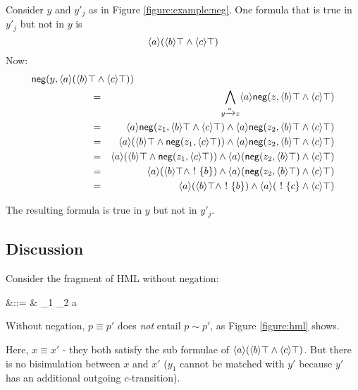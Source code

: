 Consider $y$ and $y'_j$ as in Figure \ref{figure:example:neg}.
One formula that is true in $y'_j$ but not in $y$ is
\[
\langle a \rangle (\langle b \rangle \top \land \langle c \rangle \top)
\]
Now:
\begin{eqnarray*}
\lefteqn{\mathsf{neg}(y, \langle a \rangle (\langle b \rangle \top \AND \langle c \rangle \top))}\qquad \qquad \qquad  \\
& = & \bigwedge\limits_{y \xrightarrow{a} z} \langle a \rangle \mathsf{neg}(z, \langle b \rangle \top \AND \langle c \rangle \top)  \\
& = & \langle a \rangle \mathsf{neg}(z_1, \langle b \rangle \top \AND \langle c \rangle \top) \AND \langle a \rangle\mathsf{neg}(z_2, \langle b \rangle \top \AND \langle c \rangle \top)  \\
& = & \langle a \rangle (\langle b \rangle \top \AND \mathsf{neg}(z_1, \langle c \rangle \top)) \AND \langle a \rangle\mathsf{neg}(z_2, \langle b \rangle \top \AND \langle c \rangle \top)  \\
& = & \langle a \rangle (\langle b \rangle \top \AND \mathsf{neg}(z_1, \langle c \rangle \top)) \AND \langle a \rangle(\mathsf{neg}(z_2, \langle b \rangle \top) \AND \langle c \rangle \top)  \\
& = & \langle a \rangle (\langle b \rangle \top \AND \fBang \{b\}) \AND \langle a \rangle(\mathsf{neg}(z_2, \langle b \rangle \top) \AND \langle c \rangle \top)  \\
& = & \langle a \rangle (\langle b \rangle \top \AND \fBang \{b\}) \AND \langle a \rangle(\fBang \{c\} \AND \langle c \rangle \top) 
\end{eqnarray*}

\NI The resulting formula is true in $y$ but not in $y'_j$.



\subsection{Discussion}
Consider the fragment of HML without negation:

\begin{GRAMMAR}
  \phi 
    &\quad ::= \quad&
  \top \fOr \phi_1 \AND \phi_2  \fOr \langle a \rangle \phi
\end{GRAMMAR}

\NI Without negation, $p \equiv p'$ does \emph{not} entail $p \sim
p'$, as Figure \ref{figure:hml} shows.



Here, $x \equiv x'$ - they both satisfy the sub formulae of $\langle a \rangle (\langle b \rangle \top \land \langle c \rangle \top)$.
But there is no bisimulation between $x$ and $x'$ ($y_1$ cannot be matched with $y'$ because $y'$ has an additional outgoing $c$-transition). 

